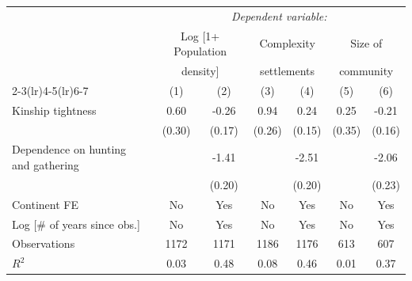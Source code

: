 {\begin{tabular}{l*{6}{c}}\toprule\toprule&\multicolumn{6}{c}{\textit{Dependent variable:}}\\[.1cm] &  \multicolumn{2}{c}{Log [1+ Population} &\multicolumn{2}{c}{Complexity} &\multicolumn{2}{c}{Size of}\\ &\multicolumn{2}{c}{density]} & \multicolumn{2}{c}{settlements} & \multicolumn{2}{c}{community}\\\cmidrule(lr){2-3}\cmidrule(lr){4-5}\cmidrule(lr){6-7}
                &\multicolumn{1}{c}{(1)}         &\multicolumn{1}{c}{(2)}         &\multicolumn{1}{c}{(3)}         &\multicolumn{1}{c}{(4)}         &\multicolumn{1}{c}{(5)}         &\multicolumn{1}{c}{(6)}         \\
\midrule
Kinship tightness&     0.60\sym{**} &    -0.26         &     0.94\sym{***}&     0.24         &     0.25         &    -0.21         \\
                &   (0.30)         &   (0.17)         &   (0.26)         &   (0.15)         &   (0.35)         &   (0.16)         \\
\addlinespace
Dependence on hunting and gathering&                  &    -1.41\sym{***}&                  &    -2.51\sym{***}&                  &    -2.06\sym{***}\\
                &                  &   (0.20)         &                  &   (0.20)         &                  &   (0.23)         \\
\addlinespace
Continent FE    &       No         &      Yes         &       No         &      Yes         &       No         &      Yes         \\
\addlinespace
Log [\# of years since obs.]&       No         &      Yes         &       No         &      Yes         &       No         &      Yes         \\
\midrule
Observations    &     1172         &     1171         &     1186         &     1176         &      613         &      607         \\
\(R^{2}\)       &     0.03         &     0.48         &     0.08         &     0.46         &     0.01         &     0.37         \\
\bottomrule
\end{tabular}
}
